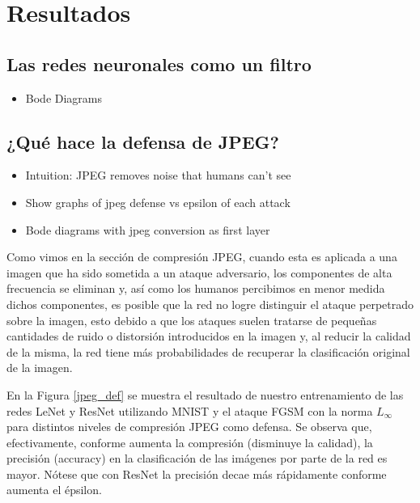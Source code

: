 \section{Resultados}
\subsection{Las redes neuronales como un filtro}
\begin{itemize}
    \item Bode Diagrams
\end{itemize}
\subsection{¿Qué hace la defensa de JPEG?}

\begin{itemize}
    \item Intuition: JPEG removes noise that humans can't see
    \item Show graphs of jpeg defense vs epsilon of each attack
    \item Bode diagrams with jpeg conversion as first layer
\end{itemize}

Como vimos en la sección de compresión JPEG, cuando esta es aplicada a una imagen que ha sido sometida a un ataque adversario, los componentes de alta frecuencia se eliminan y, así como los humanos percibimos en menor medida dichos componentes, es posible que la red no logre distinguir el ataque perpetrado sobre la imagen, esto debido a que los ataques suelen tratarse de pequeñas cantidades de ruido o distorsión introducidos en la imagen y, al reducir la calidad de la misma, la red tiene más probabilidades de recuperar la clasificación original de la imagen.

En la Figura \ref{jpeg_def} se muestra el resultado de nuestro entrenamiento de las redes LeNet y ResNet utilizando MNIST y el ataque FGSM con la norma $L_\infty$ para distintos niveles de compresión JPEG como defensa. Se observa que, efectivamente, conforme aumenta la compresión (disminuye la calidad), la precisión (accuracy) en la clasificación de las imágenes por parte de la red es mayor. Nótese que con ResNet la precisión decae más rápidamente conforme aumenta el épsilon.

